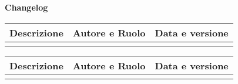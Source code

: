 \newpage

\begin{center}
	\Large{\textbf{Changelog}}
	\\\vspace{0.5cm}
	\normalsize
	\begin{tabularx}{\textwidth}{Xcc}
		\textbf{Descrizione} & \textbf{Autore e Ruolo} & \textbf{Data e versione} \\\toprule
		\modificheuno
		\bottomrule
	\end{tabularx}
	\newpage
	\begin{tabularx}{\textwidth}{Xcc}
		\textbf{Descrizione} & \textbf{Autore e Ruolo} & \textbf{Data e versione} \\\toprule
		\modifichedue
		\bottomrule
	\end{tabularx}
\end{center}
